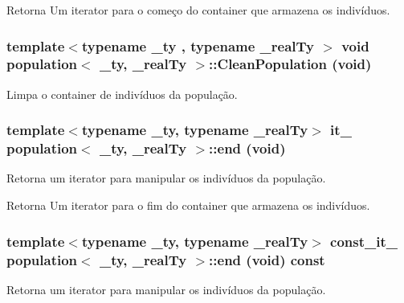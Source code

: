 \begin{DoxyReturn}{Retorna}
Um iterator para o começo do container que armazena os indivíduos. 
\end{DoxyReturn}
\hypertarget{classpopulation_a6953ec7e3cd8aa654a1621c515e0d166}{
\subsubsection[{CleanPopulation}]{\setlength{\rightskip}{0pt plus 5cm}template$<$typename \_\-ty , typename \_\-realTy $>$ void {\bf population}$<$ \_\-ty, \_\-realTy $>$::CleanPopulation (void)}}
\label{classpopulation_a6953ec7e3cd8aa654a1621c515e0d166}
Limpa o container de indivíduos da população. \hypertarget{classpopulation_a42a620c96d521b7dcbd091c086258a4c}{
\subsubsection[{end}]{\setlength{\rightskip}{0pt plus 5cm}template$<$typename \_\-ty, typename \_\-realTy$>$ {\bf it\_\-} {\bf population}$<$ \_\-ty, \_\-realTy $>$::end (void)}}
\label{classpopulation_a42a620c96d521b7dcbd091c086258a4c}
Retorna um iterator para manipular os indivíduos da população.

\begin{DoxyReturn}{Retorna}
Um iterator para o fim do container que armazena os indivíduos. 
\end{DoxyReturn}
\hypertarget{classpopulation_a38318f9ca5c607490f4d6e92b54d8734}{
\subsubsection[{end}]{\setlength{\rightskip}{0pt plus 5cm}template$<$typename \_\-ty, typename \_\-realTy$>$ {\bf const\_\-it\_\-} {\bf population}$<$ \_\-ty, \_\-realTy $>$::end (void) const}}
\label{classpopulation_a38318f9ca5c607490f4d6e92b54d8734}
Retorna um iterator para manipular os indivíduos da população.

